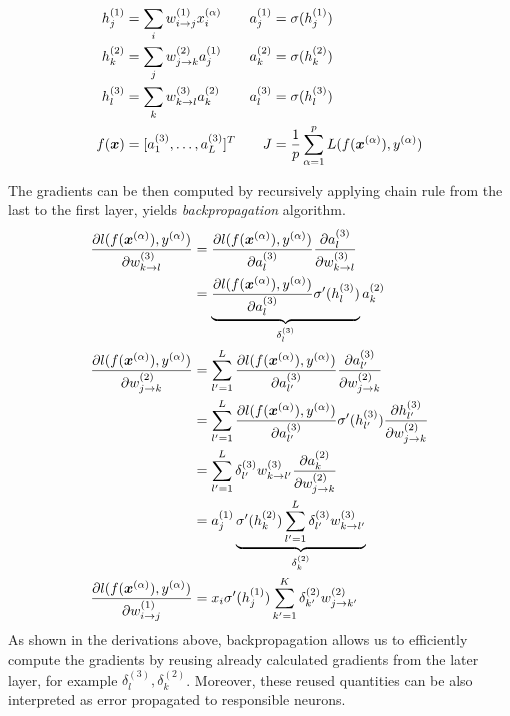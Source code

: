 \begin{align*}
		h_j^{(1)} &= \sum_i w_{i \rightarrow j}^{(1)} x_i^{(\alpha)} & a_j^{(1)} &= \sigma (h_j^{(1)})	\\
		h_k^{(2)} &= \sum_j w_{j \rightarrow k}^{(2)} a_j^{(1)}  & a_k^{(2)} &= \sigma (h_k^{(2)})	 \\
		h_l^{(3)} &= \sum_k w_{k \rightarrow l}^{(3)} a_k^{(2)} & a_l^{(3)} &= \sigma (h_l^{(3)})	 \\
		f(\x) &= [ a_1^{(3)}, \dots, a_L^{(3)}  ]^T  & J &= \frac{1}{p} \sum_{\alpha = 1}^{p} L(f(\xa), \ya)	
\end{align*}

The gradients can be then computed by recursively applying chain rule from the last to the first layer, yields \textit{backpropagation} algorithm.
\begin{align}
	\frac{\partial l(f(\xa), \ya)  }{\partial w_{k \rightarrow l}^{(3)} } &= 	\frac{\partial l(f(\xa), \ya) }{\partial a_{l}^{(3)} }  \frac{\partial a_{l}^{(3)} }{\partial w_{k \rightarrow l}^{(3)} }  	\\
		&= 	\underbrace{\frac{\partial l(f(\xa), \ya) }{\partial a_{l}^{(3)} } \sigma'(h_l^{(3)})}_{ \delta_l^{(3)}} a_{k}^{(2)} 	\\
	\frac{\partial l(f(\xa), \ya)  }{\partial w_{j \rightarrow k}^{(2)} } 
		&=  \sum_{l' = 1}^{L} 	\frac{\partial l(f(\xa), \ya) }{\partial a_{l'}^{(3)} } \frac{\partial a_{l'}^{(3)}}{\partial w_{j \rightarrow k}^{(2)}} \\
		&= \sum_{l' = 1}^{L} 	\frac{\partial l(f(\xa), \ya) }{\partial a_{l'}^{(3)} } \sigma'(h_{l'}^{(3)})  \frac{\partial h_{l'}^{(3)} }{\partial w_{j \rightarrow k}^{(2)}} \\
		&= \sum_{l' = 1}^{L} 	\delta_{l'}^{(3)}  w_{k \rightarrow l'}^{(3)} \frac{\partial a_{k}^{(2)} }{\partial w_{j \rightarrow k}^{(2)}} \\
		&= a_{j}^{(1)}  \underbrace{\sigma'(h_{k}^{(2)}) \sum_{l' = 1}^{L} 	\delta_{l'}^{(3)} w_{k \rightarrow l'}^{(3)}}_{\delta_{k}^{(2)}}  \\
	\frac{\partial l(f(\xa), \ya)  }{\partial w_{i \rightarrow j}^{(1)} } &=  x_i  \sigma'(h_{j}^{(1)}) \sum_{k' = 1}^{K} 	\delta_{k'}^{(2)} w_{j \rightarrow k'}^{(2)} 
\end{align}
As shown in the derivations above, backpropagation allows us to efficiently compute the gradients by reusing already calculated gradients from the later layer, for example $\delta_l^{(3)}, 	\delta_{k}^{(2)}$. Moreover, these reused quantities can be also interpreted as error propagated to responsible neurons.

